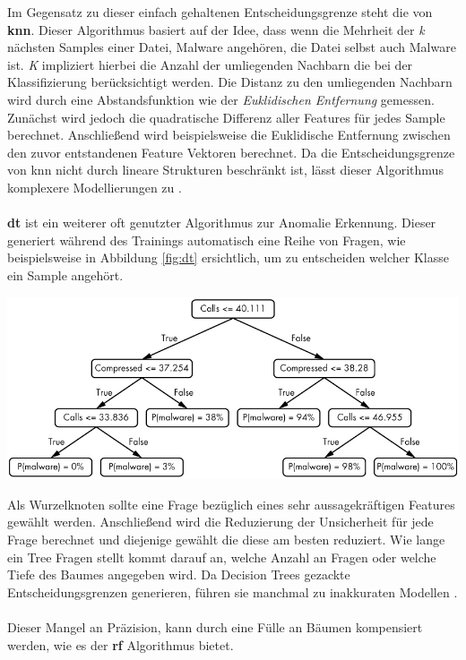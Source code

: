 \documentclass[
    12pt, %
    DIV10,
    ngerman, %
    a4paper, %
    oneside, %
    titlepage, %
    parskip=half, %
    headings=normal, %
    listof=totoc, %
    bibliography=totoc, %
    index=totoc, %
    captions=tableheading, %
    final %
]{scrreprt}
\begin{document}
Im Gegensatz zu dieser einfach gehaltenen Entscheidungsgrenze steht die von \textbf{\acl{knn}}. Dieser Algorithmus basiert auf der Idee, dass wenn die Mehrheit der \emph{k} nächsten Samples einer Datei, Malware angehören, die Datei selbst auch Malware ist. \emph{K} impliziert hierbei die Anzahl der umliegenden Nachbarn die bei der Klassifizierung berücksichtigt werden. Die Distanz zu den umliegenden Nachbarn wird durch eine Abstandsfunktion wie der \emph{Euklidischen Entfernung} gemessen. Zunächst wird jedoch die quadratische Differenz aller Features für jedes Sample berechnet. Anschlie{\ss}end wird beispielsweise die Euklidische Entfernung zwischen den zuvor entstandenen Feature Vektoren berechnet. Da die Entscheidungsgrenze von \ac{knn} nicht durch lineare Strukturen beschränkt ist, lässt dieser Algorithmus komplexere Modellierungen zu \parencite{JoshuaSaxe2018}.
\\\\
\textbf{\acl{dt}} ist ein weiterer oft genutzter Algorithmus zur Anomalie Erkennung. Dieser generiert während des Trainings automatisch eine Reihe von Fragen, wie beispielsweise in Abbildung \ref{fig:dt} ersichtlich, um zu entscheiden welcher Klasse ein Sample angehört.
\begin{center}
\includegraphics[scale=0.4]{img/dt.png}
\label{fig:dt}
\end{center}
Als Wurzelknoten sollte eine Frage bezüglich eines sehr aussagekräftigen Features gewählt werden. Anschlie{\ss}end wird die Reduzierung der Unsicherheit für jede Frage berechnet und diejenige gewählt die diese am besten reduziert. 
Wie lange ein Tree Fragen stellt kommt darauf an, welche Anzahl an Fragen oder welche Tiefe des Baumes angegeben wird.
Da Decision Trees gezackte Entscheidungsgrenzen generieren, führen sie manchmal zu inakkuraten Modellen \parencite{JoshuaSaxe2018}.
\\\\
Dieser Mangel an Präzision, kann durch eine Fülle an Bäumen kompensiert werden, wie es der \textbf{\acl{rf}} Algorithmus bietet.
\end{document}
